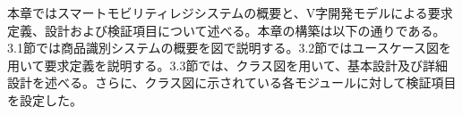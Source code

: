 本章ではスマートモビリティレジシステムの概要と、V字開発モデルによる要求定義、設計および検証項目について述べる。本章の構築は以下の通りである。3.1節では商品識別システムの概要を図で説明する。3.2節ではユースケース図を用いて要求定義を説明する。3.3節では、クラス図を用いて、基本設計及び詳細設計を述べる。さらに、クラス図に示されている各モジュールに対して検証項目を設定した。

